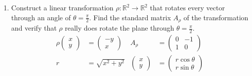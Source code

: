 \documentclass[letterpaper]{article}
\begin{document}
\begin{enumerate}
\[\begin{array}{rrr|rrr}
0&1&0&-1& 0& 1\\
0&0&1& 6&-2&-3\\
\end{array}\right)
\]
So Null$(A_T)=\{\mathbf{0}\}$ and $\dim(\text{Col}(A_T))=3$ or $\dim(\text{Col}(A_T))=\mathbb{R}^3$. Thus $T$ is 1-1 and onto.
\[T^{-1}
\left(\begin{array}{r}x\\y\\z\end{array}\right)=
\left(\begin{array}{rrr}
-1& 1& 0\\
-1& 0& 1\\
 6&-2&-3\\
\end{array}\right)
\left(\begin{array}{r}x\\y\\z\end{array}\right)
= \left(\begin{array}{c}
-x+ y\\
-x+ z\\
6x-2y-3z
\end{array}\right)
\]
\item
Construct a linear transformation $\rho:\mathbb{R}^2\to\mathbb{R}^2$ that rotates every vector through an angle of $\theta=\frac{\pi}{2}$. Find the standard matrix $A_\rho$ of the transformation and verify that $\rho$ really does rotate the plane through $\theta=\frac{\pi}{2}$.
\begin{align*}
  \rho\left(\begin{array}{c}x\\y\end{array}\right)
  &=\left(\begin{array}{r}-y\\x\end{array}\right)&
  A_\rho
  &=\left(\begin{array}{rr}0&-1\\1&0\end{array}\right)\\
  r&=\sqrt{x^2+y^2}&
  \left(\begin{array}{r}x\\y\end{array}\right)
  &=\left(\begin{array}{r}r\cos\theta\\r\sin\theta\end{array}\right)\\

\end{align*}
\end{enumerate}
\end{document}
